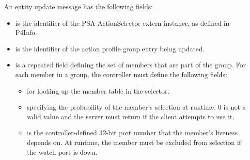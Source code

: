 \documentclass[11pt]{article}
\begin{document}
{%
An  entity update message has the following fields:%

\begin{itemize}%

\item{}
 is the  identifier of the PSA ActionSelector
extern instance, as defined in P4Info.%

\item{}
 is the  identifier of the action profile group entry being
updated.%

\item{}
 is a repeated field defining the set of members that are part of the
group. For each member in a group, the controller must define the following
fields:%

\begin{itemize}[noitemsep,topsep=\mdcompacttopsep]%

\item{} for looking up the member table in the selector.%

\item{} specifying the probability of the member's selection at
runtime. 0 is not a valid  value and the server must return
 if the client attempts to use it.%

\item{} is the controller-defined 32-bit port number that the member's
liveness depends on. At runtime, the member must be excluded from
selection if the watch port is down.%
\end{itemize}%


\end{itemize}}
\end{document}

